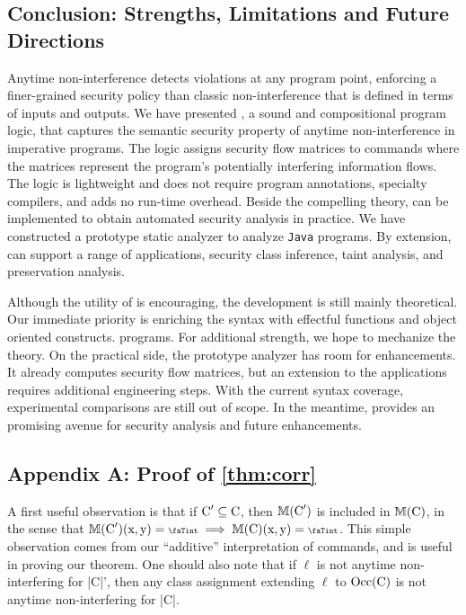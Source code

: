 \subsection{Conclusion: Strengths, Limitations and Future Directions}
\label{sec:conclusion}

Anytime non-interference detects violations at any program point, enforcing a
finer-grained security policy than classic non-interference that is defined in
terms of inputs and outputs. We have presented \lname, a sound and compositional
program logic, that captures the semantic security property of anytime
non-interference in imperative programs. The logic assigns security flow
matrices to commands where the matrices represent the program's potentially
interfering information flows. The logic is lightweight and does not require
program annotations, specialty compilers, and adds no run-time overhead. Beside
the compelling theory, \lname can be implemented to obtain automated security
analysis in practice. We have constructed a prototype static analyzer \tool to
analyze \texttt{Java} programs. By extension, \tool can support a range of
applications, \eg security class inference, taint analysis, and preservation
analysis.

Although the utility of \lname is encouraging, the development is still mainly
theoretical. Our immediate priority is enriching the syntax with effectful
functions and object oriented constructs. %
programs. For additional strength, we hope to mechanize the theory. On the
practical side, the prototype analyzer has room for enhancements. It already
computes security flow matrices, but an extension to the applications requires
additional engineering steps. With the current syntax coverage, experimental
comparisons are still out of scope. In the meantime, \lname provides an
promising avenue for security analysis and future enhancements.

\clearpage
\subsection{Appendix A: Proof of \autoref{thm:corr}}\label{app:proof}

A first useful observation is that if \(\prc|C|' \subseteq \prc|C|\), then
\(\sfm{\prc|C|'}\) is included in \(\sfm{\prc|C|}\), in the sense that
\(\sfm{\prc|C|'}(\prc|x|, \prc|y|) = \vi \implies \sfm{\prc|C|}(\prc|x|,
\prc|y|) = \vi\). This simple observation comes from our \enquote{additive}
interpretation of commands, and is useful in proving our theorem. One should
also note that if \(\ell\) is not anytime non-interfering for \prc|C|', then any
class assignment extending \(\ell\) to \(\Occ(\prc|C|)\) is not anytime
non-interfering for \prc|C|.

